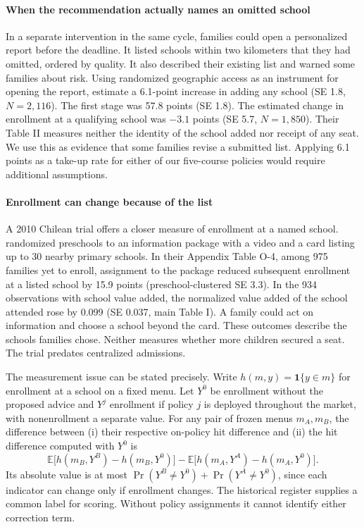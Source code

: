 \paragraph{When the recommendation actually names an omitted school}
In a separate intervention in the same cycle, families could open a personalized report before the deadline. It listed schools within two kilometers that they had omitted, ordered by quality. It also described their existing list and warned some families about risk. Using randomized geographic access as an instrument for opening the report, \citet{schoolSearch} estimate a 6.1-point increase in adding any school (SE 1.8, $N=2{,}116$). The first stage was 57.8 points (SE 1.8). The estimated change in enrollment at a qualifying school was $-3.1$ points (SE 5.7, $N=1{,}850$). Their Table II measures neither the identity of the school added nor receipt of any seat. We use this as evidence that some families revise a submitted list. Applying 6.1 points as a take-up rate for either of our five-course policies would require additional assumptions.

\paragraph{Enrollment can change because of the list}
A 2010 Chilean trial offers a closer measure of enrollment at a named school. \citet{informedEquilibrium} randomized preschools to an information package with a video and a card listing up to 30 nearby primary schools. In their Appendix Table O-4, among 975 families yet to enroll, assignment to the package reduced subsequent enrollment at a listed school by 15.9 points (preschool-clustered SE 3.3). In the 934 observations with school value added, the normalized value added of the school attended rose by 0.099 (SE 0.037, main Table I). A family could act on information and choose a school beyond the card. These outcomes describe the schools families chose. Neither measures whether more children secured a seat. The trial predates centralized admissions.

The measurement issue can be stated precisely. Write $h(m,y)=\mathbf 1\{y\in m\}$ for enrollment at a school on a fixed menu. Let $Y^0$ be enrollment without the proposed advice and $Y^j$ enrollment if policy $j$ is deployed throughout the market, with nonenrollment a separate value. For any pair of frozen menus $m_A,m_B$, the difference between (i) their respective on-policy hit difference and (ii) the hit difference computed with $Y^0$ is
\[
 \mathbb E\big[h(m_B,Y^B)-h(m_B,Y^0)\big]
 -\mathbb E\big[h(m_A,Y^A)-h(m_A,Y^0)\big].
\]
Its absolute value is at most $\Pr(Y^B\ne Y^0)+\Pr(Y^A\ne Y^0)$, since each indicator can change only if enrollment changes. The historical register supplies a common label for scoring. Without policy assignments it cannot identify either correction term.

